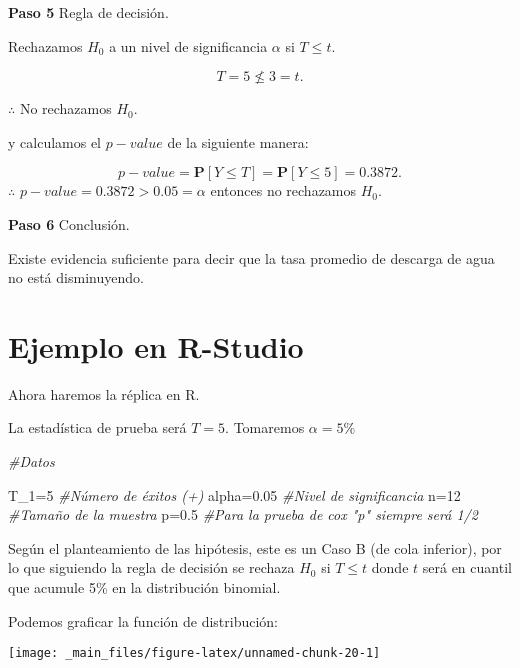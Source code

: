 \documentclass[
  a4paper,
  oneside,
  openany]{book}
\newenvironment{Shaded}{\begin{snugshade}}{\end{snugshade}}
\newcommand{\CommentTok}[1]{\textcolor[rgb]{0.56,0.35,0.01}{\textit{#1}}}
\newcommand{\DecValTok}[1]{\textcolor[rgb]{0.00,0.00,0.81}{#1}}
\newcommand{\FloatTok}[1]{\textcolor[rgb]{0.00,0.00,0.81}{#1}}
\newcommand{\NormalTok}[1]{#1}
\newcommand{\OtherTok}[1]{\textcolor[rgb]{0.56,0.35,0.01}{#1}}
\begin{document}
\textbf{Paso 5} Regla de decisión.

Rechazamos \(H_0\) a un nivel de significancia \(\alpha\) si \(T \leq t.\)

\[T=5 \nleq 3=t.\]

\(\therefore\) No rechazamos \(H_0.\)

y calculamos el \(p-value\) de la siguiente manera:

\[p-value=\mathbf{P}[Y\leq T]=\mathbf{P}[Y\leq 5]=0.3872.\]
\(\therefore\) \(p-value=0.3872>0.05=\alpha\) entonces no rechazamos \(H_0\).

\textbf{Paso 6} Conclusión.

Existe evidencia suficiente para decir que la tasa promedio de descarga de agua no está disminuyendo.

\hypertarget{ejemplo-en-r-studio-4}{%
\section{Ejemplo en R-Studio}\label{ejemplo-en-r-studio-4}}

Ahora haremos la réplica en R.

La estadística de prueba será \(T=5\). Tomaremos \(\alpha=5\%\)

\begin{Shaded}
\begin{Highlighting}[]
\CommentTok{\#Datos}

\NormalTok{T\_1}\OtherTok{=}\DecValTok{5}              \CommentTok{\#Número de éxitos (+)}
\NormalTok{alpha}\OtherTok{=}\FloatTok{0.05}       \CommentTok{\#Nivel de significancia}
\NormalTok{n}\OtherTok{=}\DecValTok{12}              \CommentTok{\#Tamaño de la muestra }
\NormalTok{p}\OtherTok{=}\FloatTok{0.5}            \CommentTok{\#Para la prueba de cox "p" siempre será 1/2}
\end{Highlighting}
\end{Shaded}

Según el planteamiento de las hipótesis, este es un Caso B (de cola inferior), por lo que siguiendo la regla de decisión se rechaza \(H_0\) si \(T\leq t\) donde \(t\) será en cuantil que acumule 5\% en la distribución binomial.

\break

Podemos graficar la función de distribución:

\begin{center}\texttt{[image: \_main\_files/figure-latex/unnamed-chunk-20-1]} \end{center}
\end{document}
